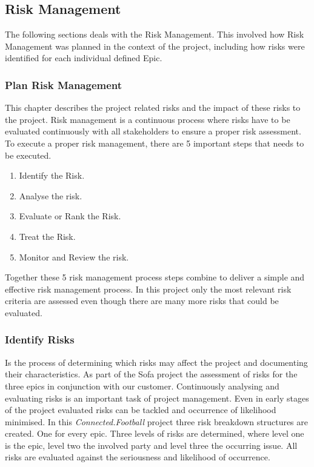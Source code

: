 
\subsection{Risk Management}
\label{ssec:risk_management}

The following sections deals with the Risk Management. This involved how Risk Management was planned in the context of the project, including how risks were identified for each individual defined Epic.

\subsubsection{Plan Risk Management}
\label{sssec:plan_risk_management}

This chapter describes the project related risks and the impact of these risks to the project. Risk management is a continuous process where risks have to be evaluated continuously with all stakeholders to ensure a proper risk assessment. To execute a proper risk management, there are 5 important steps that needs to be executed.

\begin{enumerate}
    \item Identify the Risk.
    \item Analyse the risk.
    \item Evaluate or Rank the Risk.
    \item Treat the Risk.
    \item Monitor and Review the risk.
\end{enumerate}

Together these 5 risk management process steps combine to deliver a simple and effective risk management process.
In this project only the most relevant risk criteria are assessed even though there are many more risks that could be evaluated.

\subsubsection{Identify Risks}
\label{sssec:identify_risks}

Is the process of determining which risks may affect the project and documenting their characteristics.
As part of the Sofa project the assessment of risks for the three epics in conjunction with our customer.
Continuously analysing and evaluating risks is an important task of project management. Even in early stages of the project evaluated risks can be tackled and occurrence of likelihood minimised.
In this \textit{Connected.Football} project three risk breakdown structures are created.
One for every epic. Three levels of risks are determined, where level one is the epic, level two the involved party and level three the occurring issue. All risks are evaluated against the seriousness and likelihood of occurrence.


